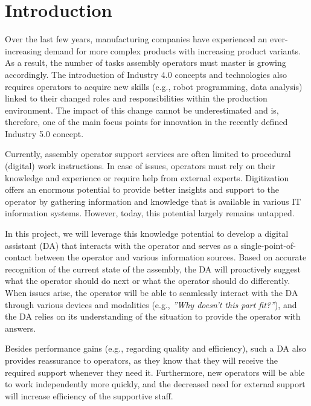 \section{Introduction}\label{sec:Introduction}

Over the last few years, manufacturing companies have experienced an ever-increasing demand for more complex products with increasing product variants. As a result, the number of tasks assembly operators must master is growing accordingly. The introduction of Industry 4.0 concepts and technologies also requires operators to acquire new skills (e.g., robot programming, data analysis) linked to their changed roles and responsibilities within the production environment. The impact of this change cannot be underestimated and is, therefore, one of the main focus points for innovation in the recently defined Industry 5.0 concept. 

Currently, assembly operator support services are often limited to procedural (digital) work instructions. In case of issues, operators must rely on their knowledge and experience or require help from external experts. Digitization offers an enormous potential to provide better insights and support to the operator by gathering information and knowledge that is available in various IT information systems. However, today, this potential largely remains untapped. 

In this project, we will leverage this knowledge potential to develop a digital assistant (DA) that interacts with the operator and serves as a single-point-of-contact between the operator and various information sources. Based on accurate recognition of the current state of the assembly, the DA will proactively suggest what the operator should do next or what the operator should do differently. When issues arise, the operator will be able to seamlessly interact with the DA through various devices and modalities (e.g., \textit{''Why doesn't this part fit?''}), and the DA relies on its understanding of the situation to provide the operator with answers. 

Besides performance gains (e.g., regarding quality and efficiency), such a DA also provides reassurance to operators, as they know that they will receive the required support whenever they need it. Furthermore, new operators will be able to work independently more quickly, and the decreased need for external support will increase efficiency of the supportive staff.
